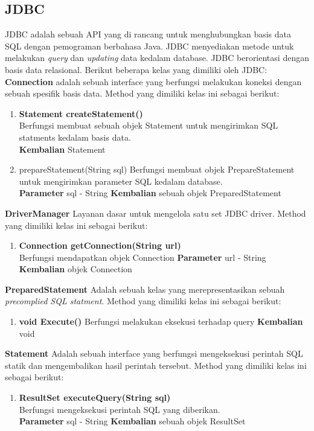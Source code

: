 \subsection{JDBC}
JDBC adalah sebuah API yang di rancang untuk menghubungkan basis data SQL dengan pemograman berbahasa Java. JDBC menyediakan metode untuk melakukan \textit{query} dan \textit{updating} data kedalam database. JDBC berorientasi dengan basis data relasional. Berikut beberapa kelas yang dimiliki oleh JDBC:\\
\textbf{Connection} adalah sebuah interface yang berfungsi melakukan koneksi dengan sebuah spesifik basis data. Method yang dimiliki kelas ini sebagai berikut:
\begin{enumerate}
	\item \textbf{Statement createStatement()}\\
	Berfungsi membuat sebuah objek Statement untuk mengirimkan SQL statments kedalam basis data.\\
	\textbf{Kembalian} Statement
	\item prepareStatement(String sql)
	Berfungsi membuat objek PrepareStatement untuk mengirimkan parameter SQL kedalam database.\\
	\textbf{Parameter} sql - String
	\textbf{Kembalian} sebuah objek PreparedStatement
\end{enumerate}
\textbf{DriverManager} Layanan dasar untuk mengelola satu set JDBC driver. Method yang dimiliki kelas ini sebagai berikut:
\begin{enumerate}
	\item \textbf{Connection getConnection(String url)}\\
	Berfungsi mendapatkan objek Connection
	\textbf{Parameter} url - String\\
	\textbf{Kembalian} objek Connection
\end{enumerate}
\textbf{PreparedStatement} Adalah sebuah kelas yang merepresentasikan sebuah \textit{precomplied SQL statment}. Method yang dimiliki kelas ini sebagai berikut:
\begin{enumerate}
\item \textbf{void Execute()}
Berfungsi melakukan eksekusi terhadap query
\textbf{Kembalian} void
\end{enumerate}
\textbf{Statement} Adalah sebuah interface yang berfungsi mengeksekusi perintah SQL statik dan mengembalikan hasil perintah tersebut. Method yang dimiliki kelas ini sebagai berikut:
\begin{enumerate}
	\item \textbf{ResultSet executeQuery(String sql)}\\
	Berfungsi mengeksekusi perintah SQL yang diberikan.\\
	\textbf{Parameter} sql - String
	\textbf{Kembalian} sebuah objek ResultSet
\end{enumerate}